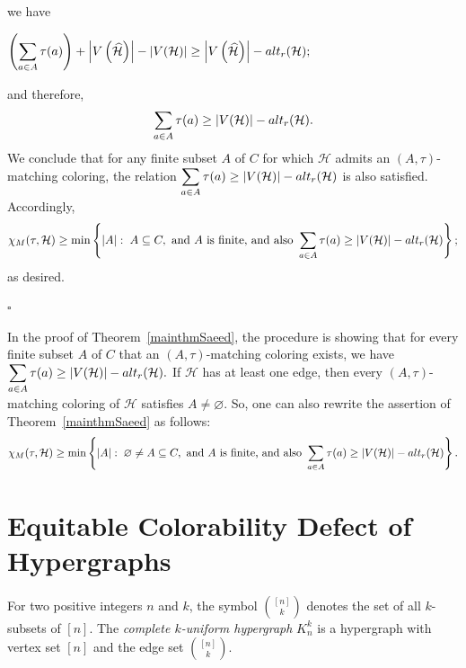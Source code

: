 \documentclass[11pt]{amsart}
\theoremstyle{definition}
\begin{document}
we have
\begin{center}
	$\left( \displaystyle\sum_{a\in A}\tau(a) \right) + \left|V\left(\widehat{{\mathcal H}}\right)\right|-|V({\mathcal H})| \geq \left|V\left(\widehat{{\mathcal H}}\right)\right|-{\rm alt}_r({\mathcal H});$
\end{center}
and therefore,
$$\displaystyle\sum_{a\in A}\tau(a) \geq  |V({\mathcal H})|-{\rm alt}_r({\mathcal H}) .$$
We conclude that for any finite subset $A$ of $C$ for which ${\mathcal{H}}$ admits an $(A,\tau)$-matching coloring, the relation
$\displaystyle\sum_{a\in A}\tau(a) \geq  |V({\mathcal H})|-{\rm alt}_r({\mathcal H}) $ is also satisfied. Accordingly,
$$\chi_M(\tau,{\mathcal H})\geq \min \left\{|A|:\;   A \subseteq C, \mbox{ and } A \mbox{ is finite,}  \mbox{ and also } \sum_{a\in A}\tau(a) \geq  |V({\mathcal H})|-{\rm alt}_r({\mathcal H})\right\} ;$$
as desired.

\hfill$\square$

In the proof of Theorem~\ref{mainthmSaeed}, the procedure is showing that for every finite subset $A$ of $C$
that an $(A,\tau)$-matching coloring  exists, we have
$ \displaystyle\sum_{a\in A}\tau(a) \geq  |V({\mathcal H})|-{\rm alt}_r({\mathcal H}).$
If ${\mathcal H}$ has at least one edge, then every $(A,\tau)$-matching coloring of ${\mathcal H}$ satisfies $ A\neq\varnothing$. So, one can also rewrite the assertion of Theorem~\ref{mainthmSaeed}
as follows:
$$\chi_M(\tau,{\mathcal H})\geq \min \left\{|A|:\;   \varnothing \neq A \subseteq C, \mbox{ and } A \mbox{ is finite,}  \mbox{ and also } \sum_{a\in A}\tau(a) \geq  |V({\mathcal H})|-{\rm alt}_r({\mathcal H})\right\} .$$




\maketitle
\section{{\bf Equitable Colorability Defect of Hypergraphs}}

\def\cprime{$'$} \def\cprime{$'$}
For two positive integers $n$ and $k$, the symbol ${[n]\choose k}$  denotes the set of all $k$-subsets of $[n]$.
The {\it complete $k$-uniform  hypergraph}  $K_n^k$ is a hypergraph with vertex set $[n]$ and the edge set ${[n]\choose k}$.
\end{document}
